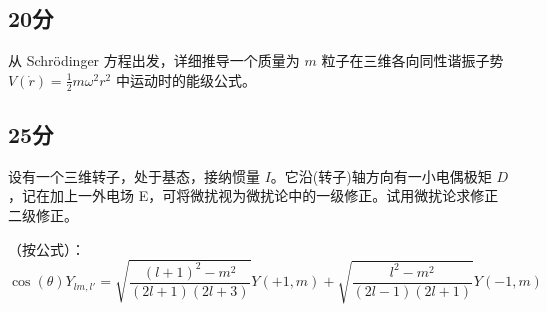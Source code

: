 \subsection{20分}
 从 Schrödinger 方程出发，详细推导一个质量为 $m$ 粒子在三维各向同性谐振子势 $V(\dot{r}) = \frac{1}{2} m \omega^2 r^2$ 中运动时的能级公式。
\subsection{25分}
 设有一个三维转子，处于基态，接纳惯量 $I$。它沿(转子)轴方向有一小电偶极矩 $D$，记在加上一外电场 E，可将微扰视为微扰论中的一级修正。试用微扰论求修正二级修正。

（按公式）：
$$\cos(\theta)Y_{lm, l'} = \sqrt{\frac{(l+1)^2 - m^2}{(2l+1)(2l+3)}} Y(+1, m) + \sqrt{\frac{l^2 - m^2}{(2l-1)(2l+1)}} Y(-1, m)~$$
